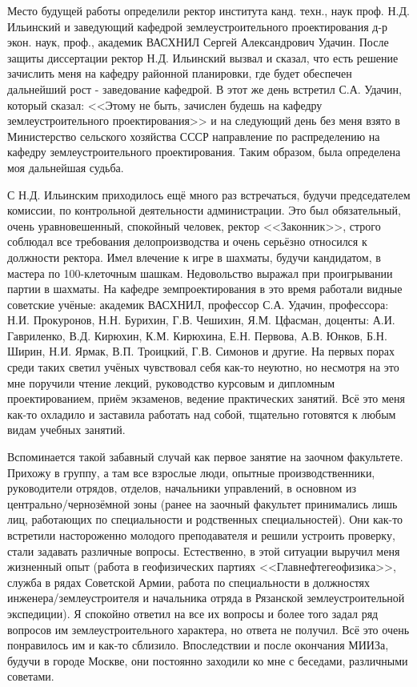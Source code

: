 Место будущей работы определили ректор института канд. техн., наук проф. Н.Д. Ильинский и заведующий кафедрой землеустроительного проектирования д-р экон. наук, проф., академик ВАСХНИЛ Сергей Александрович Удачин. После защиты диссертации ректор Н.Д. Ильинский вызвал и сказал, что есть решение зачислить меня на кафедру районной планировки, где будет обеспечен дальнейший рост - заведование кафедрой. В этот же день встретил С.А. Удачин, который сказал: <<Этому не быть, зачислен будешь на кафедру землеустроительного проектирования>> и на следующий день без меня взято в Министерство сельского хозяйства СССР направление по распределению на кафедру землеустроительного проектирования. Таким образом, была определена моя дальнейшая судьба. 

С Н.Д. Ильинским приходилось ещё много раз встречаться, будучи председателем комиссии, по контрольной деятельности администрации. Это был обязательный, очень уравновешенный, спокойный человек, ректор <<Законник>>, строго соблюдал все требования делопроизводства и очень серьёзно относился к должности ректора. Имел влечение к игре в шахматы, будучи кандидатом, в мастера по 100-клеточным шашкам. Недовольство выражал при проигрывании партии в шахматы. На кафедре земпроектирования в это время работали видные советские учёные: академик ВАСХНИЛ, профессор С.А. Удачин, профессора: Н.И. Прокуронов, Н.Н. Бурихин, Г.В. Чешихин, Я.М. Цфасман, доценты: А.И. Гавриленко, В.Д. Кирюхин, К.М. Кирюхина, Е.Н. Первова, А.В. Юнков, Б.Н. Ширин, Н.И. Ярмак, В.П. Троицкий, Г.В. Симонов и другие. На первых порах среди таких светил учёных чувствовал себя как-то неуютно, но несмотря на это мне поручили чтение лекций, руководство курсовым и дипломным проектированием, приём экзаменов, ведение практических занятий. Всё это меня как-то охладило и заставила работать над собой, тщательно готовятся к любым видам учебных занятий.

Вспоминается такой забавный случай как первое занятие на заочном факультете. Прихожу в группу, а там все взрослые люди, опытные производственники, руководители отрядов, отделов, начальники управлений, в основном из центрально\-/чернозёмной зоны (ранее на заочный факультет принимались лишь лиц, работающих по специальности и родственных специальностей). Они как-то встретили настороженно молодого преподавателя и решили устроить проверку, стали задавать различные вопросы. Естественно, в этой ситуации выручил меня жизненный опыт (работа в геофизических партиях <<Главнефтегеофизика>>, служба в рядах Советской Армии, работа по специальности в должностях инженера\-/землеустроителя и начальника отряда в Рязанской землеустроительной экспедиции). Я спокойно ответил на все их вопросы и более того задал ряд вопросов им землеустроительного характера, но ответа не получил. Всё это очень понравилось им и как-то сблизило. Впоследствии и после окончания МИИЗа, будучи в городе Москве, они постоянно заходили ко мне с беседами, различными советами. 

